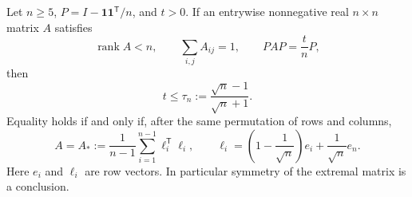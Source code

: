 \begin{lemma}
\label{lem:r75-singular-coefficient}
Let $n\ge5$, $P=I-\mathbf1\mathbf1^{\mathsf T}/n$, and $t>0$.
If an entrywise nonnegative real $n\times n$ matrix $A$ satisfies
\[
 \operatorname{rank}A<n,\qquad
 \sum_{i,j}A_{ij}=1,\qquad PAP=\frac tnP,
\]
then
\begin{equation}\label{eq:r75-sharp-threshold}
 t\le\tau_n:=\frac{\sqrt n-1}{\sqrt n+1}.
\end{equation}
Equality holds if and only if, after the same permutation of rows
and columns,
\begin{equation}\label{eq:r75-extremal-coefficient}
 A=A_*:=\frac1{n-1}\sum_{i=1}^{n-1}
                  \ell_i^{\mathsf T}\ell_i,
 \qquad
 \ell_i=\left(1-\frac1{\sqrt n}\right)e_i+
                         \frac1{\sqrt n}e_n.
\end{equation}
Here $e_i$ and $\ell_i$ are row vectors. In particular symmetry of
the extremal matrix is a conclusion.
\end{lemma}
